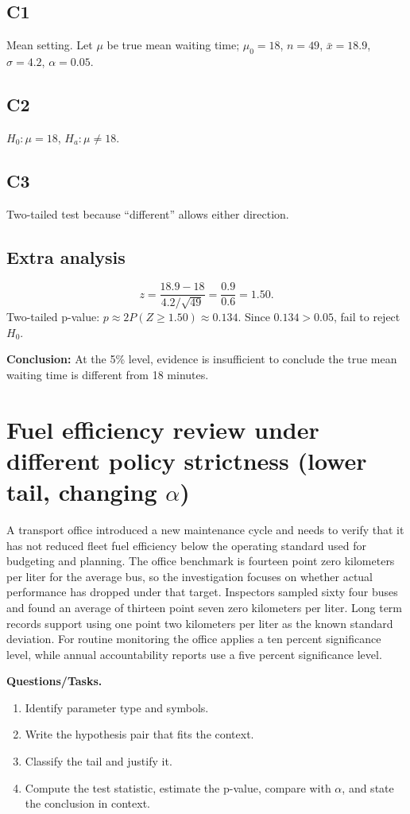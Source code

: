 \subsection*{C1}
Mean setting. Let \(\mu\) be true mean waiting time; \(\mu_0=18\), \(n=49\), \(\bar{x}=18.9\), \(\sigma=4.2\), \(\alpha=0.05\).

\subsection*{C2}
\(H_0:\mu=18\), \(H_a:\mu\ne 18\).

\subsection*{C3}
Two-tailed test because ``different'' allows either direction. \TwoTailGraph

\subsection*{Extra analysis}
\[
z=\frac{18.9-18}{4.2/\sqrt{49}}=\frac{0.9}{0.6}=1.50.
\]
Two-tailed p-value: \(p\approx 2P(Z\ge 1.50)\approx 0.134\). Since \(0.134>0.05\), fail to reject \(H_0\).

\textbf{Conclusion:} At the 5\% level, evidence is insufficient to conclude the true mean waiting time is different from 18 minutes.


\section{Fuel efficiency review under different policy strictness (lower tail, changing \(\alpha\))}
A transport office introduced a new maintenance cycle and needs to verify that it has not reduced fleet fuel efficiency below the operating standard used for budgeting and planning. The office benchmark is fourteen point zero kilometers per liter for the average bus, so the investigation focuses on whether actual performance has dropped under that target. Inspectors sampled sixty four buses and found an average of thirteen point seven zero kilometers per liter. Long term records support using one point two kilometers per liter as the known standard deviation. For routine monitoring the office applies a ten percent significance level, while annual accountability reports use a five percent significance level.

\textbf{Questions/Tasks.}
\begin{enumerate}
    \item[(C1)] Identify parameter type and symbols.
    \item[(C2)] Write the hypothesis pair that fits the context.
    \item[(C3)] Classify the tail and justify it.
    \item[(Extra analysis)] Compute the test statistic, estimate the p-value, compare with \(\alpha\), and state the conclusion in context.
\end{enumerate}

